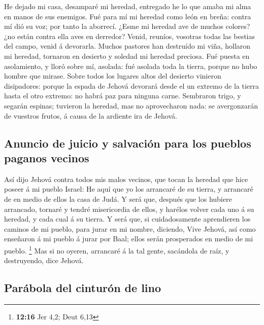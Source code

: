  He dejado mi casa, desamparé mi heredad, entregado he lo
que amaba mi alma en manos de sus enemigos.  Fué para mí
mi heredad como león en breña: contra mí dió su voz; por tanto la
aborrecí.  ¿Esme mi heredad ave de muchos colores? ¿no
están contra ella aves en derredor? Venid, reuníos, vosotras todas las
bestias del campo, venid á devorarla.  Muchos pastores
han destruído mi viña, hollaron mi heredad, tornaron en desierto y
soledad mi heredad preciosa.  Fué puesta en asolamiento,
y lloró sobre mí, asolada: fué asolada toda la tierra, porque no hubo
hombre que mirase.  Sobre todos los lugares altos del
desierto vinieron disipadores: porque la espada de Jehová devorará desde
el un extremo de la tierra hasta el otro extremo: no habrá paz para
ninguna carne.  Sembraron trigo, y segarán espinas;
tuvieron la heredad, mas no aprovecharon nada: se avergonzarán de
vuestros frutos, á causa de la ardiente ira de Jehová.

\hypertarget{anuncio-de-juicio-y-salvaciuxf3n-para-los-pueblos-paganos-vecinos}{%
\subsection{Anuncio de juicio y salvación para los pueblos paganos
vecinos}\label{anuncio-de-juicio-y-salvaciuxf3n-para-los-pueblos-paganos-vecinos}}

 Así dijo Jehová contra todos mis malos vecinos, que
tocan la heredad que hice poseer á mi pueblo Israel: He aquí que yo los
arrancaré de su tierra, y arrancaré de en medio de ellos la casa de
Judá.  Y será que, después que los hubiere arrancado,
tornaré y tendré misericordia de ellos, y harélos volver cada uno á su
heredad, y cada cual á su tierra.  Y será que, si
cuidadosamente aprendieren los caminos de mi pueblo, para jurar en mi
nombre, diciendo, Vive Jehová, así como enseñaron á mi pueblo á jurar
por Baal; ellos serán prosperados en medio de mi pueblo. \footnote{\textbf{12:16}
  Jer 4,2; Deut 6,13}  Mas si no oyeren, arrancaré á la
tal gente, sacándola de raíz, y destruyendo, dice Jehová.

\hypertarget{paruxe1bola-del-cinturuxf3n-de-lino}{%
\subsection{Parábola del cinturón de
lino}\label{paruxe1bola-del-cinturuxf3n-de-lino}}

